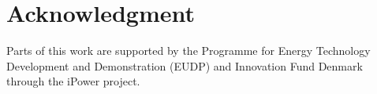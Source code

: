 %
%


\section*{Acknowledgment}
Parts of this work are supported by the Programme for Energy Technology Development and Demonstration (EUDP) and Innovation Fund Denmark through the iPower project.

